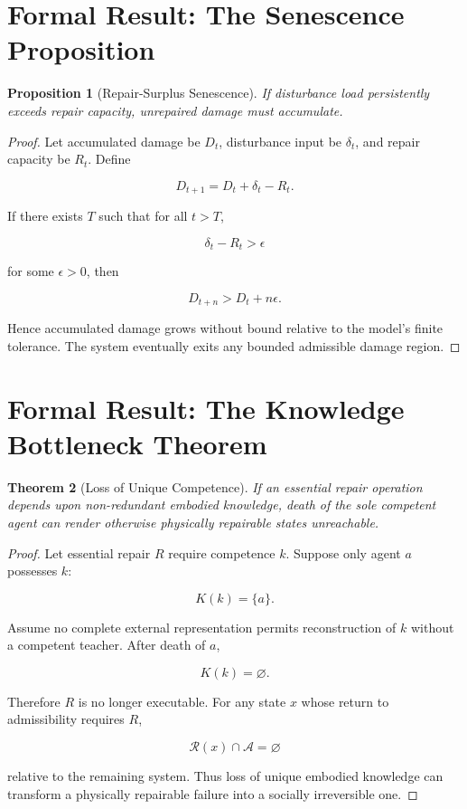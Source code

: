 \documentclass[11pt,oneside]{book}
\newtheorem{theorem}{Theorem}[chapter]
\newtheorem{proposition}[theorem]{Proposition}
\theoremstyle{definition}
\theoremstyle{remark}
\newcommand{\A}{\mathcal{A}}
\newcommand{\R}{\mathcal{R}}
\begin{document}
\section{Formal Result: The Senescence Proposition}

\begin{proposition}[Repair-Surplus Senescence] If disturbance load persistently exceeds repair
capacity, unrepaired damage must accumulate. \end{proposition} \begin{proof} Let accumulated damage
be \(D_t\), disturbance input be \(\delta_t\), and repair capacity be \(R_t\). Define

\[
D_{t+1} = D_t+\delta_t-R_t.
\]

If there exists \(T\) such that for all \(t>T\),

\[
\delta_t-R_t>\epsilon
\]

for some \(\epsilon>0\), then

\[
D_{t+n} > D_t+n\epsilon.
\]

Hence accumulated damage grows without bound relative to the model's finite tolerance. The system
eventually exits any bounded admissible damage region. \end{proof}

\section{Formal Result: The Knowledge Bottleneck Theorem}

\begin{theorem}[Loss of Unique Competence] If an essential repair operation depends upon
non-redundant embodied knowledge, death of the sole competent agent can render otherwise physically
repairable states unreachable. \end{theorem} \begin{proof} Let essential repair \(R\) require
competence \(k\). Suppose only agent \(a\) possesses \(k\):

\[
K(k)=\{a\}.
\]

Assume no complete external representation permits reconstruction of \(k\) without a competent
teacher. After death of \(a\),

\[
K(k)=\varnothing.
\]

Therefore \(R\) is no longer executable. For any state \(x\) whose return to admissibility requires
\(R\),

\[
\R(x)\cap\A=\varnothing
\]

relative to the remaining system. Thus loss of unique embodied knowledge can transform a physically
repairable failure into a socially irreversible one. \end{proof}
\end{document}
